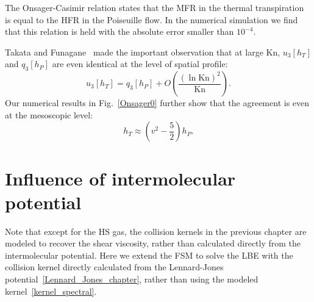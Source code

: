 

The Onsager-Casimir relation states that the MFR in the thermal transpiration is equal to the HFR in the Poiseuille flow. In the numerical simulation we find that this relation is held with the absolute error smaller than $10^{-4}$. 

Takata and Funagane~\cite{Takata2011} made the important observation that at large $\text{Kn}$, $u_3[h_T]$ and $q_3[h_P]$ are even identical at the level of spatial profile:
\begin{equation}
u_3[h_T]=q_3[h_P]+O\left(\frac{(\ln{\text{Kn}})^2}{\text{Kn}}\right).
\end{equation}
Our numerical results in Fig.~\ref{Onsager0} further show that the agreement is even at the mesoscopic level:
\begin{equation}
h_T\approx\left({v}^2-\frac{5}{2}\right)h_P.
\end{equation} 

%



\section{Influence of intermolecular potential}

Note that except for the HS gas, the collision kernels in the previous chapter are modeled to recover the shear viscosity, rather than calculated directly from the intermolecular potential. Here we extend the FSM to solve the LBE with the collision kernel directly calculated from the Lennard-Jones potential~\eqref{Lennard_Jones_chapter}, rather than using the modeled kernel~\eqref{kernel_spectral}. 





